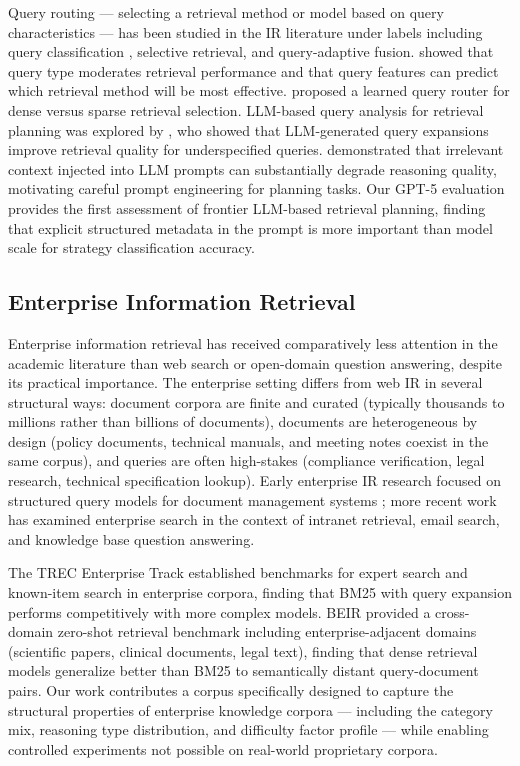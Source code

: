 \documentclass[11pt, a4paper]{article}
\begin{document}
Query routing --- selecting a retrieval method or model based on query characteristics --- has been studied in the IR literature under labels including query classification \citep{salton1975smart}, selective retrieval, and query-adaptive fusion. \citet{nogueira2019passage} showed that query type moderates retrieval performance and that query features can predict which retrieval method will be most effective. \citet{zhang2023hybrid} proposed a learned query router for dense versus sparse retrieval selection. LLM-based query analysis for retrieval planning was explored by \citet{ma2023query}, who showed that LLM-generated query expansions improve retrieval quality for underspecified queries. \citet{shi2023large} demonstrated that irrelevant context injected into LLM prompts can substantially degrade reasoning quality, motivating careful prompt engineering for planning tasks. Our GPT-5 evaluation provides the first assessment of frontier LLM-based retrieval planning, finding that explicit structured metadata in the prompt is more important than model scale for strategy classification accuracy.

\subsection{Enterprise Information Retrieval}

Enterprise information retrieval has received comparatively less attention in the academic literature than web search or open-domain question answering, despite its practical importance. The enterprise setting differs from web IR in several structural ways: document corpora are finite and curated (typically thousands to millions rather than billions of documents), documents are heterogeneous by design (policy documents, technical manuals, and meeting notes coexist in the same corpus), and queries are often high-stakes (compliance verification, legal research, technical specification lookup). Early enterprise IR research focused on structured query models for document management systems \citep{baeza1999modern}; more recent work has examined enterprise search in the context of intranet retrieval, email search, and knowledge base question answering.

The TREC Enterprise Track \citep{voorhees2005trec} established benchmarks for expert search and known-item search in enterprise corpora, finding that BM25 with query expansion performs competitively with more complex models. BEIR \citep{thakur2021beir} provided a cross-domain zero-shot retrieval benchmark including enterprise-adjacent domains (scientific papers, clinical documents, legal text), finding that dense retrieval models generalize better than BM25 to semantically distant query-document pairs. Our work contributes a corpus specifically designed to capture the structural properties of enterprise knowledge corpora --- including the category mix, reasoning type distribution, and difficulty factor profile --- while enabling controlled experiments not possible on real-world proprietary corpora.
\end{document}

